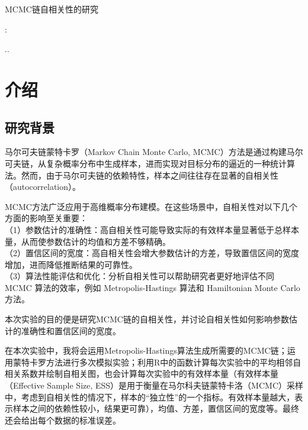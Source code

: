 \documentclass[12pt]{article}
\begin{document}
	\pagestyle{empty}
	\vspace*{8em}
	\begin{center}
		{\Huge MCMC链自相关性的研究}\\
		\bigskip  %
	\end{center}
	\vspace{8em}  %
	\begin{center}
		{\Large  %
			
			:\underline{}\\
		}
	\end{center}
	\vspace{20em}  %
	\begin{center}
		
		\the\year.\the\month.\the\day
	\end{center}
	\clearpage  
	\newpage

\section{介绍}

\subsection{研究背景}
\indent 马尔可夫链蒙特卡罗（Markov Chain Monte Carlo, MCMC）方法是通过构建马尔可夫链，从复杂概率分布中生成样本，进而实现对目标分布的逼近的一种统计算法。然而，由于马尔可夫链的依赖特性，样本之间往往存在显著的自相关性（autocorrelation）。

MCMC方法广泛应用于高维概率分布建模。在这些场景中，自相关性对以下几个方面的影响至关重要：\\
（1）参数估计的准确性：高自相关性可能导致实际的有效样本量显著低于总样本量，从而使参数估计的均值和方差不够精确。\\
（2）置信区间的宽度：高自相关性会增大参数估计的方差，导致置信区间的宽度增加，进而降低推断结果的可靠性。\\
（3）算法性能评估和优化：分析自相关性可以帮助研究者更好地评估不同 MCMC 算法的效率，例如 Metropolis-Hastings 算法和 Hamiltonian Monte Carlo 方法。

本次实验的目的便是研究MCMC链的自相关性，并讨论自相关性如何影响参数估计的准确性和置信区间的宽度。

在本次实验中，我将会运用Metropolis-Hastings算法生成所需要的MCMC链；运用蒙特卡罗方法进行多次模拟实验；利用R中的函数计算每次实验中的平均相邻自相关系数并绘制自相关图，也会计算每次实验中的有效样本量（有效样本量（Effective Sample Size, ESS）是用于衡量在马尔科夫链蒙特卡洛（MCMC）采样中，考虑到自相关性的情况下，样本的“独立性”的一个指标。有效样本量越大，表示样本之间的依赖性较小，结果更可靠），均值、方差，置信区间的宽度等。最终还会给出每个数据的标准误差。
\end{document}
